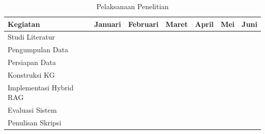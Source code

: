 \begin{table}[htbp]
    \centering
    \caption{Pelaksanaan Penelitian}
    \label{tab:jadwal-penelitian}
    \renewcommand{\arraystretch}{1.3}
    \small
    \begin{tabular}{@{}|l|c|c|c|c|c|c|@{}}
        \hline
        \textbf{Kegiatan}       & \textbf{Januari}    & \textbf{Februari}   & \textbf{Maret}      & \textbf{April}      & \textbf{Mei}        & \textbf{Juni}       \\
        \hline
        Studi Literatur         & \cellcolor{gray!40} & \cellcolor{gray!40} &                     &                     &                     &                     \\
        \hline
        Pengumpulan Data        &                     & \cellcolor{gray!40} & \cellcolor{gray!40} &                     &                     &                     \\
        \hline
        Persiapan Data          &                     &                     & \cellcolor{gray!40} & \cellcolor{gray!40} &                     &                     \\
        \hline
        Konstruksi KG           &                     &                     &                     & \cellcolor{gray!40} & \cellcolor{gray!40} &                     \\
        \hline
        Implementasi Hybrid RAG &                     &                     &                     &                     & \cellcolor{gray!40} & \cellcolor{gray!40} \\
        \hline
        Evaluasi Sistem         &                     &                     &                     &                     &                     & \cellcolor{gray!40} \\
        \hline
        Penulisan Skripsi       &                     & \cellcolor{gray!40} & \cellcolor{gray!40} & \cellcolor{gray!40} & \cellcolor{gray!40} & \cellcolor{gray!40} \\
        \hline
    \end{tabular}
\end{table}
